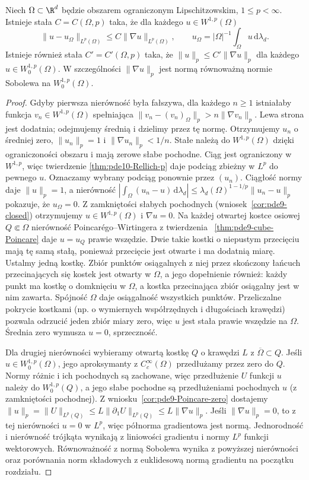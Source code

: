 \begin{wniosek}
\label{cor:pde10-Poincare}
Niech $\Omega\subset\R^d$ będzie obszarem ograniczonym Lipschitzowskim, $1\le p<\infty$.
Istnieje stała $C=C(\Omega,p)$ taka, że dla każdego
$u\in W^{1,p}(\Omega)$
\[
 \|u-u_\Omega\|_{L^p(\Omega)}
 \le C\|\nabla u\|_{L^p(\Omega)},\qquad
 u_\Omega=|\Omega|^{-1}\int_\Omega u\,\mathrm d\lambda_d.
\]
Istnieje również stała $C'=C'(\Omega,p)$ taka, że
$\|u\|_p\le C'\|\nabla u\|_p$ dla każdego
$u\in W_0^{1,p}(\Omega)$. W szczególności
$\|\nabla u\|_p$ jest normą równoważną normie Sobolewa
na $W_0^{1,p}(\Omega)$.
\end{wniosek}
\begin{proof}
Gdyby pierwsza nierówność była fałszywa, dla każdego
$n\ge1$ istniałaby funkcja $v_n\in W^{1,p}(\Omega)$
spełniająca $\|v_n-(v_n)_\Omega\|_p>n\|\nabla v_n\|_p$.
Lewa strona jest dodatnia; odejmujemy średnią i dzielimy
przez tę normę. Otrzymujemy $u_n$ o średniej zero,
$\|u_n\|_p=1$ i $\|\nabla u_n\|_p<1/n$.
Stałe należą do $W^{1,p}(\Omega)$ dzięki ograniczoności
obszaru i mają zerowe słabe pochodne.
Ciąg jest ograniczony w $W^{1,p}$, więc twierdzenie
\ref{thm:pde10-Rellich-p} daje podciąg zbieżny w
$L^p$ do pewnego $u$. Oznaczamy wybrany podciąg
ponownie przez $(u_n)$. Ciągłość normy daje $\|u\|_p=1$,
a nierówność
$|\int_\Omega (u_n-u)\,\mathrm d\lambda_d|
\le\lambda_d(\Omega)^{1-1/p}\|u_n-u\|_p$
pokazuje, że $u_\Omega=0$.
Z zamkniętości słabych pochodnych
(wniosek~\ref{cor:pde9-closed}) otrzymujemy
$u\in W^{1,p}(\Omega)$ i $\nabla u=0$.
Na każdej otwartej kostce osiowej $Q\Subset\Omega$
nierówność Poincarégo--Wirtingera z twierdzenia
~\ref{thm:pde9-cube-Poincare} daje $u=u_Q$ prawie wszędzie.
Dwie takie kostki o niepustym przecięciu mają tę samą
stałą, ponieważ przecięcie jest otwarte i ma dodatnią miarę.
Ustalmy jedną kostkę. Zbiór punktów osiągalnych z niej
przez skończony łańcuch przecinających się kostek
jest otwarty w $\Omega$, a jego dopełnienie również:
każdy punkt ma kostkę o domknięciu w $\Omega$,
a kostka przecinająca zbiór osiągalny jest w nim zawarta.
Spójność $\Omega$ daje osiągalność wszystkich punktów.
Przeliczalne pokrycie kostkami (np. o wymiernych
współrzędnych i długościach krawędzi) pozwala odrzucić
jeden zbiór miary zero, więc $u$ jest stała prawie wszędzie
na $\Omega$. Średnia zero wymusza $u=0$, sprzeczność.

Dla drugiej nierówności wybieramy otwartą kostkę
$Q$ o krawędzi $L$ z $\overline\Omega\subset Q$.
Jeśli $u\in W_0^{1,p}(\Omega)$, jego aproksymanty
z $C_c^\infty(\Omega)$ przedłużamy przez zero do $Q$.
Normy różnic i ich pochodnych są zachowane,
więc przedłużenie $U$ funkcji $u$ należy do
$W_0^{1,p}(Q)$, a jego słabe pochodne są przedłużeniami
pochodnych $u$ (z zamkniętości pochodnej).
Z wniosku~\ref{cor:pde9-Poincare-zero} dostajemy
$\|u\|_p=\|U\|_{L^p(Q)}\le L\|\partial_1 U\|_{L^p(Q)}
\le L\|\nabla u\|_p$.
Jeśli $\|\nabla u\|_p=0$, to z tej nierówności $u=0$
w $L^p$, więc półnorma gradientowa jest normą.
Jednorodność i nierówność trójkąta wynikają z liniowości
gradientu i normy $L^p$ funkcji wektorowych.
Równoważność z normą Sobolewa wynika z powyższej
nierówności oraz porównania norm składowych
z euklidesową normą gradientu na początku rozdziału.
\end{proof}

